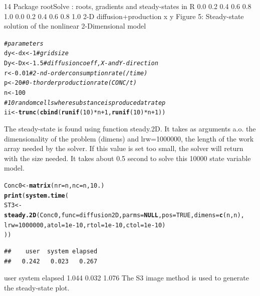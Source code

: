 \documentclass{tufte-handout}\usepackage[]{graphicx}\usepackage[]{xcolor}
\makeatletter
\newcommand{\hlnum}[1]{\textcolor[rgb]{0.686,0.059,0.569}{#1}}%
\newcommand{\hlcom}[1]{\textcolor[rgb]{0.678,0.584,0.686}{\textit{#1}}}%
\newcommand{\hlopt}[1]{\textcolor[rgb]{0,0,0}{#1}}%
\newcommand{\hlstd}[1]{\textcolor[rgb]{0.345,0.345,0.345}{#1}}%
\newcommand{\hlkwa}[1]{\textcolor[rgb]{0.161,0.373,0.58}{\textbf{#1}}}%
\newcommand{\hlkwb}[1]{\textcolor[rgb]{0.69,0.353,0.396}{#1}}%
\newcommand{\hlkwc}[1]{\textcolor[rgb]{0.333,0.667,0.333}{#1}}%
\newcommand{\hlkwd}[1]{\textcolor[rgb]{0.737,0.353,0.396}{\textbf{#1}}}%
\newenvironment{kframe}{%
 \def\at@end@of@kframe{}%
 \ifinner\ifhmode%
  \def\at@end@of@kframe{\end{minipage}}%
  \begin{minipage}{\columnwidth}%
 \fi\fi%
 \def\FrameCommand##1{\hskip\@totalleftmargin \hskip-\fboxsep
 \colorbox{shadecolor}{##1}\hskip-\fboxsep
     \hskip-\linewidth \hskip-\@totalleftmargin \hskip\columnwidth}%
 \MakeFramed {\advance\hsize-\width
   \@totalleftmargin\z@ \linewidth\hsize
   \@setminipage}}%
 {\par\unskip\endMakeFramed%
 \at@end@of@kframe}
\newenvironment{knitrout}{}{} %
\makeatother
\begin{document}
14 Package rootSolve : roots, gradients and steady-states in R
0.0 0.2 0.4 0.6 0.8 1.0
0.0 0.2 0.4 0.6 0.8 1.0
2-D diffusion+production
x
y
Figure 5: Steady-state solution of the nonlinear 2-Dimensional model
\begin{knitrout}
\color{fgcolor}\begin{kframe}
\begin{alltt}
\hlcom{# parameters}
\hlstd{dy} \hlkwb{<-} \hlstd{dx} \hlkwb{<-} \hlnum{1} \hlcom{# grid size}
\hlstd{Dy} \hlkwb{<-} \hlstd{Dx} \hlkwb{<-} \hlnum{1.5} \hlcom{# diffusion coeff, X- and Y-direction}
\hlstd{r} \hlkwb{<-} \hlnum{0.01} \hlcom{# 2-nd-order consumption rate (/time)}
\hlstd{p} \hlkwb{<-} \hlnum{20} \hlcom{# 0-th order production rate (CONC/t)}
\hlstd{n} \hlkwb{<-} \hlnum{100}
\hlcom{# 10 random cells where substance is produced at rate p}
\hlstd{ii} \hlkwb{<-} \hlkwd{trunc}\hlstd{(}\hlkwd{cbind}\hlstd{(}\hlkwd{runif}\hlstd{(}\hlnum{10}\hlstd{)}\hlopt{*}\hlstd{n}\hlopt{+}\hlnum{1}\hlstd{,}\hlkwd{runif}\hlstd{(}\hlnum{10}\hlstd{)}\hlopt{*}\hlstd{n}\hlopt{+}\hlnum{1}\hlstd{))}
\end{alltt}
\end{kframe}
\end{knitrout}
The steady-state is found using function steady.2D. It takes as arguments a.o. the dimensionality
of the problem (dimens) and lrw=1000000, the length of the work array needed by
the solver. If this value is set too small, the solver will return with the size needed.
It takes about 0.5 second to solve this 10000 state variable model.
\begin{knitrout}
\color{fgcolor}\begin{kframe}
\begin{alltt}
\hlstd{Conc0} \hlkwb{<-} \hlkwd{matrix}\hlstd{(}\hlkwc{nr}\hlstd{=n,}\hlkwc{nc}\hlstd{=n,}\hlnum{10.}\hlstd{)}
\hlkwd{print}\hlstd{(}\hlkwd{system.time}\hlstd{(}
\hlstd{ST3} \hlkwb{<-} \hlkwd{steady.2D}\hlstd{(Conc0,}\hlkwc{func}\hlstd{=diffusion2D,}\hlkwc{parms}\hlstd{=}\hlkwa{NULL}\hlstd{,}\hlkwc{pos}\hlstd{=}\hlnum{TRUE}\hlstd{,}\hlkwc{dimens}\hlstd{=}\hlkwd{c}\hlstd{(n,n),}
\hlkwc{lrw}\hlstd{=}\hlnum{1000000}\hlstd{,}\hlkwc{atol}\hlstd{=}\hlnum{1e-10}\hlstd{,}\hlkwc{rtol}\hlstd{=}\hlnum{1e-10}\hlstd{,}\hlkwc{ctol}\hlstd{=}\hlnum{1e-10}\hlstd{)}
\hlstd{))}
\end{alltt}
\begin{verbatim}
##    user  system elapsed 
##   0.242   0.023   0.267
\end{verbatim}
\end{kframe}
\end{knitrout}
user system elapsed
1.044 0.032 1.076
The S3 image method is used to generate the steady-state plot.
\end{document}
